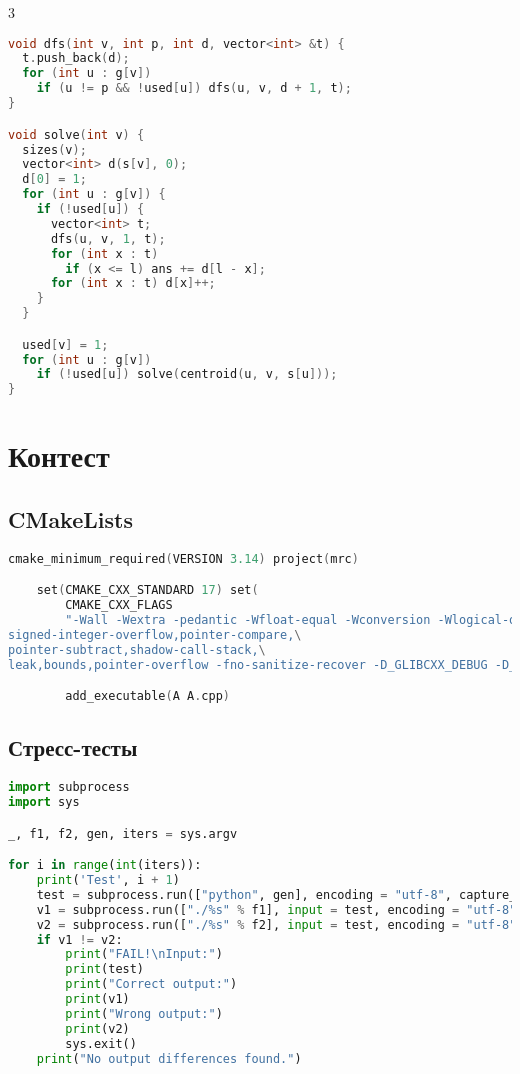 \documentclass[10pt,a4paper,landscape,twosided]{extarticle}
\begin{document}
\begin{multicols}{3}
\begin{lstlisting}[language=C++]
void dfs(int v, int p, int d, vector<int> &t) {
  t.push_back(d);
  for (int u : g[v])
    if (u != p && !used[u]) dfs(u, v, d + 1, t);
}

void solve(int v) {
  sizes(v);
  vector<int> d(s[v], 0);
  d[0] = 1;
  for (int u : g[v]) {
    if (!used[u]) {
      vector<int> t;
      dfs(u, v, 1, t);
      for (int x : t)
        if (x <= l) ans += d[l - x];
      for (int x : t) d[x]++;
    }
  }

  used[v] = 1;
  for (int u : g[v])
    if (!used[u]) solve(centroid(u, v, s[u]));
}
\end{lstlisting}

\section{Контест}

\subsection{CMakeLists}
\begin{lstlisting}[language=C++]
cmake_minimum_required(VERSION 3.14) project(mrc)

    set(CMAKE_CXX_STANDARD 17) set(
        CMAKE_CXX_FLAGS
        "-Wall -Wextra -pedantic -Wfloat-equal -Wconversion -Wlogical-op -Wshift-overflow=2 -fsanitize=address,undefined,\
signed-integer-overflow,pointer-compare,\
pointer-subtract,shadow-call-stack,\
leak,bounds,pointer-overflow -fno-sanitize-recover -D_GLIBCXX_DEBUG -D_GLIBCXX_DEBUG_PEDANTIC -DONPC")

        add_executable(A A.cpp)
\end{lstlisting}

\subsection{Стресс-тесты}
\begin{lstlisting}[language=Python]
import subprocess
import sys

_, f1, f2, gen, iters = sys.argv

for i in range(int(iters)):
    print('Test', i + 1)
    test = subprocess.run(["python", gen], encoding = "utf-8", capture_output = True).stdout
    v1 = subprocess.run(["./%s" % f1], input = test, encoding = "utf-8", capture_output = True).stdout
    v2 = subprocess.run(["./%s" % f2], input = test, encoding = "utf-8", capture_output = True).stdout
    if v1 != v2:
        print("FAIL!\nInput:")
        print(test)
        print("Correct output:")
        print(v1)
        print("Wrong output:")
        print(v2)
        sys.exit()
    print("No output differences found.")
\end{lstlisting}


\end{multicols}
\end{document}
